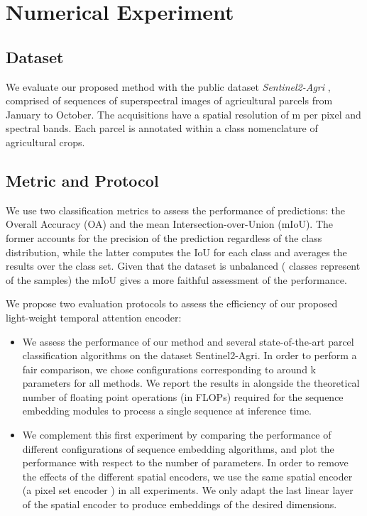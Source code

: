 \documentclass[runningheads]{llncs}
\begin{document}
%
 \section{Numerical Experiment}
\subsection{Dataset}
We evaluate our proposed method with the public dataset \emph{Sentinel2-Agri} \cite{garnot2019satellite}, comprised of  sequences of  superspectral images of agricultural parcels from January to October. The acquisitions have a spatial resolution of m per pixel and  spectral bands. Each parcel is annotated within a  class nomenclature of agricultural crops.
\subsection{Metric and Protocol}
We use two classification metrics to assess the performance of predictions: the Overall Accuracy (OA) and the mean Intersection-over-Union (mIoU). The former accounts for the precision of the prediction regardless of the class distribution, while the latter computes the IoU for each class and averages the results over the class set. Given that the dataset is unbalanced ( classes represent  of the samples) the mIoU gives a more faithful assessment of the performance. 

We propose two evaluation protocols to assess the efficiency of our proposed light-weight temporal attention encoder:
\begin{itemize}
    \item[] We assess the performance of our method and several state-of-the-art parcel classification algorithms on the dataset Sentinel2-Agri.
    In order to perform a fair comparison, we chose configurations corresponding to around k parameters for all methods. We report the results in  alongside the theoretical number of floating point operations (in FLOPs) required for the sequence embedding modules to process a single sequence at inference time.
    \item[]
    We complement this first experiment by comparing the performance of  different configurations of sequence embedding algorithms, and plot the performance with respect to the number of parameters. 
    In order to remove the effects of the different spatial encoders, we use the same spatial encoder (a pixel set encoder \cite{garnot2019satellite}) in all experiments. We only adapt the last linear layer of the spatial encoder to produce embeddings of the desired dimensions.
\end{itemize}
\end{document}
